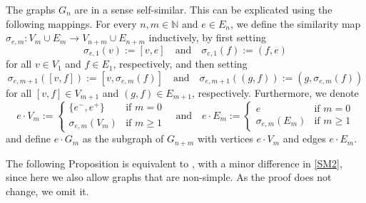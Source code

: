 \documentclass{amsart}
\numberwithin{equation}{section}
\theoremstyle{definition}
\theoremstyle{remark}
\newcommand{\N}{\mathbb{N}}
\begin{document}
The graphs $G_n$ are in a sense self-similar. This can be explicated using the following mappings. For every \(n,m\in \N\) and \(e\in E_n\), we define the similarity map \(\sigma_{e,m}\colon V_m\cup E_m\to V_{n+m}\cup E_{n+m}\) inductively, by first setting
        \[
            \sigma_{e,1}(v):=[v,e]\quad\text{and}\quad\sigma_{e,1}(f):=(f,e)
        \]
    for all \(v\in V_1\) and \(f\in E_1\), respectively, and then setting
        \[
            \sigma_{e,{m+1}}([v,f]):=[v,\sigma_{e,m}(f)]\quad\text{and}\quad \sigma_{e,m+1}((g,f)):=(g,\sigma_{e,m}(f))
        \]
    for all \([v,f]\in V_{m+1}\) and \((g,f)\in E_{m+1}\), respectively. Furthermore, we denote
    \[
        e\cdot V_m:=
            \begin{cases}
                \{e^-,e^+\}&\text{if }m=0\\ 
                \sigma_{e,m}(V_m)&\text{if }m\geq 1
            \end{cases}
        \quad\text{and}\quad 
        e\cdot E_m:=
            \begin{cases}
                e&\text{if }m=0\\
                \sigma_{e,m}(E_m)&\text{if }m\geq 1
            \end{cases}
    \]
    and define \(e\cdot G_m\) as the subgraph of \(G_{n+m}\) with vertices \(e\cdot V_m\) and edges \(e\cdot E_m\).

The following Proposition is equivalent to \cite[Proposition 3.11]{anttila2024constructions}, with a minor difference in \ref{SM2}, since here we also allow graphs that are non-simple. As the proof does not change, we omit it.
\end{document}
